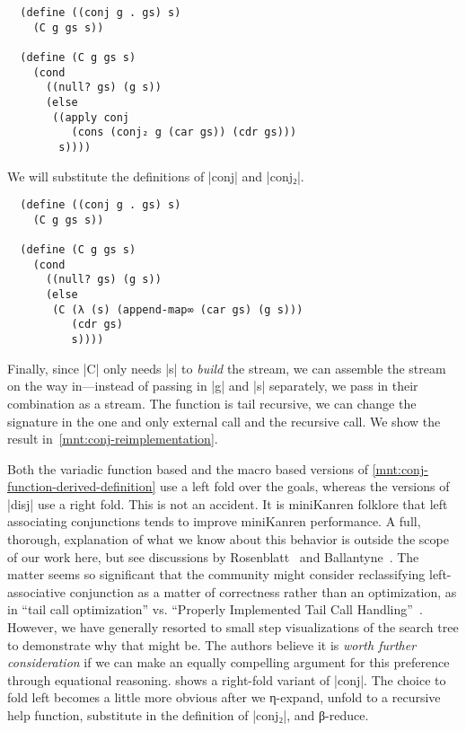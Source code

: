 \documentclass[sigplan,screen,draft,anonymous,review,natbib=false]{acmart}
\begin{document}
\begin{verbatim}
  (define ((conj g . gs) s)
    (C g gs s))

  (define (C g gs s)
    (cond
      ((null? gs) (g s))
      (else
       ((apply conj
          (cons (conj₂ g (car gs)) (cdr gs)))
        s))))
\end{verbatim}

\noindent We will substitute the definitions of \rackinline|conj| and
\rackinline|conj₂|.

\begin{verbatim}
  (define ((conj g . gs) s)
    (C g gs s))

  (define (C g gs s)
    (cond
      ((null? gs) (g s))
      (else
       (C (λ (s) (append-map∞ (car gs) (g s)))
          (cdr gs)
          s))))
\end{verbatim}

Finally, since \rackinline|C| only needs \rackinline|s| to
\emph{build} the stream, we can assemble the stream on the way
in---instead of passing in \rackinline|g| and \rackinline|s|
separately, we pass in their combination as a stream. The function is
tail recursive, we can change the signature in the one and only
external call and the recursive call. We show the result
in~\cref{mnt:conj-reimplementation}.

Both the variadic function based and the macro based versions of
\cref{mnt:conj-function-derived-definition} use a left fold over the
goals, whereas the versions of \rackinline|disj| use a right fold.
This is not an accident. It is miniKanren folklore that left
associating conjunctions tends to improve miniKanren performance. A
full, thorough, explanation of what we know about this behavior is
outside the scope of our work here, but see discussions by
Rosenblatt~\cite{nowhere} and Ballantyne~\cite{nowhere}. The matter
seems so significant that the community might consider reclassifying
left-associative conjunction as a matter of correctness rather than an
optimization, as in \enquote{tail call optimization} vs.
\enquote{Properly Implemented Tail Call
  Handling}~\cite{felleisen2014requestions}. However, we have
generally resorted to small step visualizations of the search tree to
demonstrate why that might be. The authors believe it is \emph{worth
  further consideration} if we can make an equally compelling argument
for this preference through equational reasoning.
 shows a right-fold variant of
\rackinline|conj|. The choice to fold left becomes a little more
obvious after we η-expand, unfold to a recursive help function,
substitute in the definition of \rackinline|conj₂|, and β-reduce.
\end{document}

